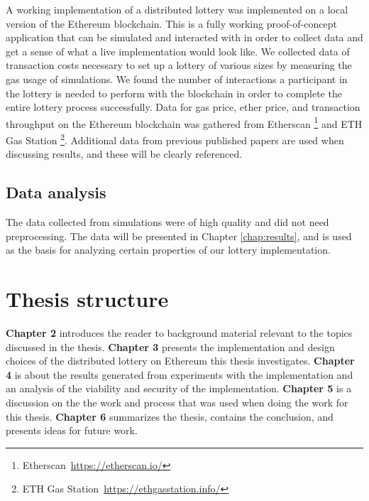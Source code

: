 A working implementation of a distributed lottery was implemented on a local version of the Ethereum blockchain. This is a fully working proof-of-concept application that can be simulated and interacted with in order to collect data and get a sense of what a live implementation would look like. 
We collected data of transaction costs necessary to set up a lottery of various sizes by measuring the gas usage of simulations. 
We found the number of interactions a participant in the lottery is needed to perform with the blockchain in order to complete the entire lottery process successfully. 
Data for gas price, ether price, and transaction throughput on the Ethereum blockchain was gathered from Etherscan \footnote{Etherscan~\url{https://etherscan.io/}} and ETH Gas Station \footnote{ETH Gas Station~\url{https://ethgasstation.info/}}. 
Additional data from previous published papers are used when discussing results, and these will be clearly referenced.

\subsection{Data analysis}

The data collected from simulations were of high quality and did not need preprocessing. The data will be presented in Chapter \ref{chap:results}, and is used as the basis for analyzing certain properties of our lottery implementation. 

\section{Thesis structure}

\textbf{Chapter 2} introduces the reader to background material relevant to the topics discussed in the thesis. \newline
\textbf{Chapter 3} presents the implementation and design choices of the distributed lottery on Ethereum this thesis investigates.
\newline
\textbf{Chapter 4} is about the results generated from experiments with the implementation and an analysis of the viability and security of the implementation.
\newline
\textbf{Chapter 5} is a discussion on the the work and process that was used when doing the work for this thesis.
\newline
\textbf{Chapter 6} summarizes the thesis, contains the conclusion, and presents ideas for future work. 
